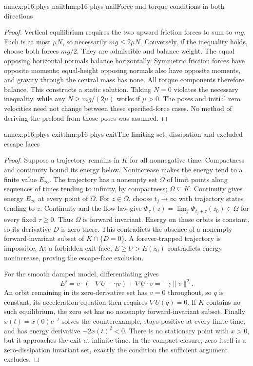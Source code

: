 \begin{annexitem}{annex:p16.phys-nail}{thm:p16-phys-nail}{Force and torque conditions in both directions}
\begin{proof}
Vertical equilibrium requires the two upward friction forces to sum to
\(mg\). Each is at most \(\mu N\), so necessarily \(mg\le2\mu N\).
Conversely, if the inequality holds, choose both forces \(mg/2\).
They are admissible and balance weight. The equal opposing horizontal
normals balance horizontally. Symmetric friction forces have opposite
moments; equal-height opposing normals also have opposite moments, and
gravity through the central mass has none. All torque components therefore
balance. This constructs a static solution. Taking \(N=0\) violates
the necessary inequality, while any \(N\ge mg/(2\mu)\) works if
\(\mu>0\). The poses and initial zero velocities need not change
between these specified-force cases. No method of deriving the preload
from those poses was assumed.
\end{proof}
\end{annexitem}

\begin{annexitem}{annex:p16.phys-exit}{thm:p16-phys-exit}{The limiting set, dissipation and excluded escape faces}
\begin{proof}
Suppose a trajectory remains in \(K\) for all nonnegative time. Compactness
and continuity bound its energy below. Nonincrease makes the energy tend
to a finite value \(E_\infty\). The trajectory has a nonempty set
\(\Omega\) of limit points along sequences of times tending to infinity,
by compactness; \(\Omega\subseteq K\). Continuity gives energy
\(E_\infty\) at every point of \(\Omega\).
For \(z\in\Omega\), choose \(t_j\to\infty\) with trajectory
states tending to \(z\). Continuity and the flow law give
\(\Phi_\tau(z)=\lim_j\Phi_{t_j+\tau}(z_0)\in\Omega\) for
every fixed \(\tau\ge0\). Thus \(\Omega\) is forward invariant.
Energy on those orbits is constant, so its derivative \(D\) is zero
there. This contradicts the absence of a nonempty forward-invariant subset
of \(K\cap\{D=0\}\). A forever-trapped trajectory is impossible.
At a forbidden exit face, \(E\ge U>E(z_0)\) contradicts energy
nonincrease, proving the escape-face exclusion.

For the smooth damped model, differentiating gives
\[
 E'=v\cdot(-\nabla U-\gamma v)+\nabla U\cdot v
    =-\gamma\|v\|^2.
\]
An orbit remaining in its zero-derivative set has \(v=0\) throughout,
so \(q\) is constant; its acceleration equation then requires
\(\nabla U(q)=0\). If \(K\) contains no such equilibrium, the
zero set has no nonempty forward-invariant subset. Finally
\(x(t)=x(0)e^{-t}\) solves the counterexample, stays positive at every
finite time, and has energy derivative \(-2x(t)^2<0\). There is no
stationary point with \(x>0\), but it approaches the exit at infinite
time. In the compact closure, zero itself is a zero-dissipation invariant
set, exactly the condition the sufficient argument excludes.
\end{proof}
\end{annexitem}

